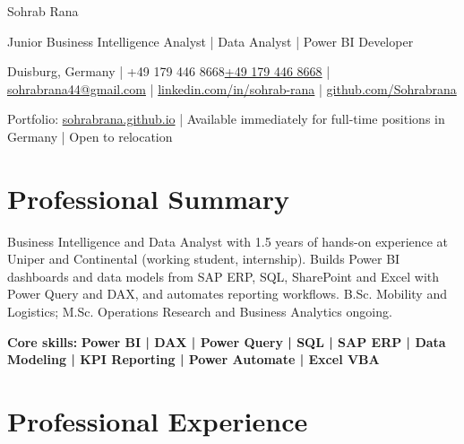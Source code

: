 \documentclass[10pt,a4paper]{article}
\makeatletter
\newcommand{\cvname}{Sohrab Rana}
\newcommand{\cvheadline}{Junior Business Intelligence Analyst | Data Analyst | Power BI Developer}
\newcommand{\cvlocation}{Duisburg, Germany}
\def\cvphone{+49 179 446 8668}
\def\cvphonelink{+491794468668}
\newcommand{\cvemail}{sohrabrana44@gmail.com}
\newcommand{\cvlinkedin}{linkedin.com/in/sohrab-rana}
\newcommand{\cvgithub}{github.com/Sohrabrana}
\newcommand{\cvportfolio}{sohrabrana.github.io}
\makeatother
\begin{document}
{\color{white}\fontsize{27}{29}\selectfont \cvname\par}
\vspace{0.2em}
{\large\color{signal}\selectfont \cvheadline\par}
\vspace{0.35em}
{\small\color{bandtext}
\cvlocation{} | \ifx\cvphone\empty\else\href{tel:\cvphonelink}{\color{white}\cvphone} | \fi\href{mailto:\cvemail}{\color{white}\cvemail} | \href{https://www.\cvlinkedin}{\color{white}\cvlinkedin} | \href{https://\cvgithub}{\color{white}\cvgithub}\par
\vspace{0.12em}
Portfolio: \href{https://\cvportfolio}{\color{white}\cvportfolio} | Available immediately for full-time positions in Germany | Open to relocation\par}
\vspace{0.62cm}

\section{Professional Summary}
Business Intelligence and Data Analyst with 1.5 years of hands-on experience at Uniper and Continental (working student, internship). Builds Power BI dashboards and data models from SAP ERP, SQL, SharePoint and Excel with Power Query and DAX, and automates reporting workflows. B.Sc. Mobility and Logistics; M.Sc. Operations Research and Business Analytics ongoing.\par
\vspace{0.2em}
{\bfseries Core skills:} {\color{accent}\bfseries Power BI | DAX | Power Query | SQL | SAP ERP | Data Modeling | KPI Reporting | Power Automate | Excel VBA}\par

\section{Professional Experience}
\end{document}
